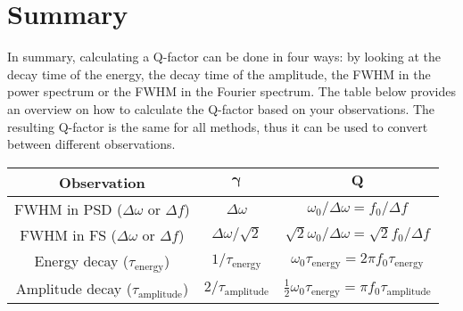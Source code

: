 \section{Summary}
In summary, calculating a Q-factor can be done in four ways: by looking at the decay time of the energy, the decay time of the amplitude, the FWHM in the power spectrum or the FWHM in the Fourier spectrum. The table below provides an overview on how to calculate the Q-factor based on your observations. The resulting Q-factor is the same for all methods, thus it can be used to convert between different observations.

\begin{table}[h]
    \centering
    \begin{tabular}{ccc}
        \toprule
        \textbf{Observation} & $\bm{\gamma}$ & $\bm{Q}$ \\
        \midrule
        FWHM in PSD ($\Delta \omega$ or $\Delta f$) & $\Delta \omega$ & $\omega_0 / \Delta \omega = f_0 / \Delta f$ \\
        FWHM in FS ($\Delta \omega$ or $\Delta f$) & $\Delta \omega / \sqrt{2}$ & $\sqrt{2} \omega_0 / \Delta \omega = \sqrt{2} f_0 / \Delta f$ \\
        Energy decay ($\tau_\text{energy}$) & $1 / \tau_\text{energy}$ & $\omega_0 \tau_\text{energy} = 2\pi f_0 \tau_\text{energy}$ \\
        Amplitude decay ($\tau_\text{amplitude}$) & $2 / \tau_\text{amplitude}$ & $\frac{1}{2} \omega_0 \tau_\text{energy} = \pi f_0 \tau_\text{amplitude}$ \\
        \bottomrule
    \end{tabular}
\end{table}
